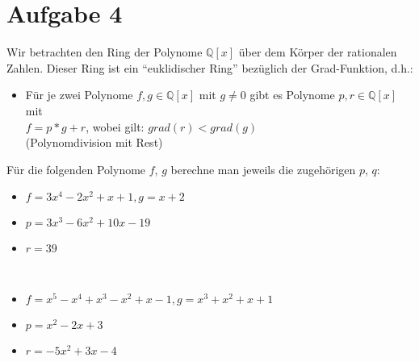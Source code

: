 \section*{Aufgabe 4}

Wir betrachten den Ring der Polynome $\mathbb{Q}[x]$ über dem Körper der rationalen Zahlen. Dieser Ring ist ein ``euklidischer Ring'' bezüglich der Grad-Funktion, d.h.:

\begin{itemize}[label=""]
\item Für je zwei Polynome $f, g \in \mathbb{Q}[x]$ mit $g \neq 0$ gibt es Polynome $p, r \in \mathbb{Q}[x]$ mit\\
$f = p * g + r$, wobei gilt: $grad(r) < grad(g)$\\
(Polynomdivision mit Rest)
\end{itemize}

Für die folgenden Polynome $f$, $g$ berechne man jeweils die zugehörigen $p$, $q$:

\begin{itemize}[label={a)}, leftmargin=*]
\item $f = 3x^4 - 2x^2 + x + 1, g = x + 2$
\end{itemize}


\begin{itemize}[leftmargin=*]
\item $p = 3x^3 - 6x^2 + 10x - 19$
\item $r = 39$
\end{itemize}\


\begin{itemize}[label={b)}, leftmargin=*]
\item $f = x^5 - x^4 + x^3 - x^2 + x - 1, g = x^3 + x^2 + x + 1$
\end{itemize}


\begin{itemize}[leftmargin=*]
\item $p = x^2 -2x + 3$
\item $r = -5x^2 +3x -4$
\end{itemize}\


